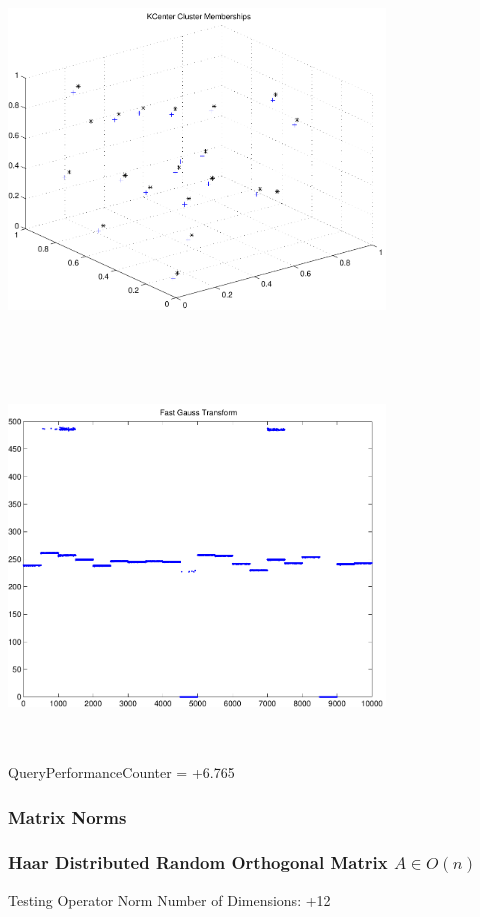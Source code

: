 \documentclass[9pt]{article}
\theoremstyle{plain}
\theoremstyle{definition}
\theoremstyle{remark}
\numberwithin{equation}{section}
\begin{document}
\includegraphics[width=10.0cm,height=10.0cm]{KCenterClusterMemberships_20_Centers.pdf}

\includegraphics[width=10.0cm,height=10.0cm]{FGT20_Centers.pdf}

QueryPerformanceCounter  =  +6.765
\subsubsection{Matrix Norms}
\subsubsection{Haar Distributed Random Orthogonal Matrix $A \in O(n)$}
 Testing Operator Norm
Number of Dimensions: +12
\end{document}
